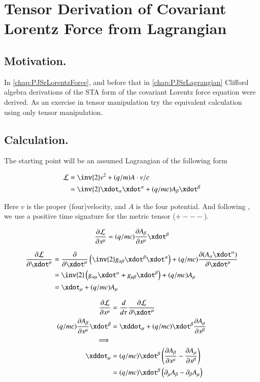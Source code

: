 \chapter{Tensor Derivation of Covariant Lorentz Force from Lagrangian}

\section{Motivation. }

In \ref{chap:PJSrLorentzForce}, and before that in \ref{chap:PJSrLagrangian} Clifford
algebra derivations of the STA form of the covariant Lorentz force equation
were derived.  As an exercise in tensor manipulation try the equivalent
calculation using only tensor manipulation.

\section{Calculation. }

The starting point will be an assumed Lagrangian of the following form

\begin{align}\label{eqn:maxwell_tensor_lagrangian:lagrangian}
\LL &= \inv{2} v^2 + (q/m) A \cdot v/c \\
&= \inv{2} \xdot_\alpha \xdot^\alpha + (q/mc) A_\beta \xdot^\beta
\end{align}

Here $v$ is the proper (four)velocity, and $A$ is the four potential.
And following \cite{doran2003gap}, we use a positive time signature for the metric tensor ($+---$).

\begin{align*}
\PD{x^\mu}{\LL} = (q/mc) \PD{x^\mu}{A_\beta} \xdot^\beta
\end{align*}

\begin{align*}
\PD{\xdot^\mu}{\LL}
&= \PD{\xdot^\mu}{} \left( \inv{2} g_{\alpha\beta} \xdot^\beta \xdot^\alpha \right) + (q/mc) \PD{\xdot^\mu}{(A_\alpha \xdot^\alpha)} \\
&= \inv{2} \left( g_{\alpha\mu} \xdot^\alpha +g_{\mu\beta} \xdot^\beta \right) + (q/mc) A_\mu \\
&= \xdot_\mu + (q/mc) A_\mu \\
\end{align*}

\begin{align*}
\PD{x^\mu}{\LL} &= \frac{d}{d\tau} \PD{\xdot^\mu}{\LL} \\
(q/mc) \PD{x^\mu}{A_\beta} \xdot^\beta &= \xddot_\mu + (q/mc) \xdot^\beta \PD{x^\beta}{A_\mu} \\
\implies \\
\xddot_\mu
&= (q/mc) \xdot^\beta \left( \PD{x^\mu}{A_\beta} - \PD{x^\beta}{A_\mu} \right) \\
&= (q/mc) \xdot^\beta \left( \partial_\mu {A_\beta} - \partial_{\beta}{A_\mu} \right) \\
\end{align*}

